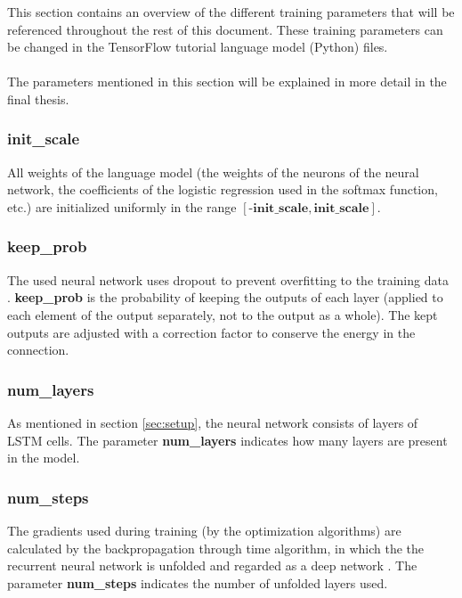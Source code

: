 \documentclass[10pt,a4paper,titlepage]{article}
\begin{document}
This section contains an overview of the different training parameters that will be referenced throughout the rest of this document. These training parameters can be changed in the TensorFlow tutorial language model (Python) files. \\
\\
The parameters mentioned in this section will be explained in more detail in the final thesis.

\subsubsection{init\_scale}
	
All weights of the language model (the weights of the neurons of the neural network, the coefficients of the logistic regression used in the softmax function, etc.) are initialized uniformly in the range $[\textbf{-init\_scale},\textbf{init\_scale}]$.

\subsubsection{keep\_prob}

The used neural network uses dropout to prevent overfitting to the training data \cite{dropout}. \textbf{keep\_prob} is the probability of keeping the outputs of each layer (applied to each element of the output separately, not to the output as a whole). The kept outputs are adjusted with a correction factor to conserve the energy in the connection.

\subsubsection{num\_layers}

As mentioned in section \ref{sec:setup}, the neural network consists of layers of LSTM cells. The parameter \textbf{num\_layers} indicates how many layers are present in the model.

\subsubsection{num\_steps}
\label{subsubsec:numsteps}

The gradients used during training (by the optimization algorithms) are calculated by the backpropagation through time algorithm, in which the the recurrent neural network is unfolded and regarded as a deep network \cite{bptt}. The parameter \textbf{num\_steps} indicates the number of unfolded layers used.
\end{document}
